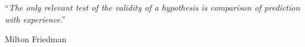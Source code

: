 \begin{frame}
\begin{center}
{\huge ``\emph{The only relevant test of the validity of a hypothesis is comparison of prediction with experience}.''\par}
\vspace{1cm}
Milton Friedman
\end{center}
\end{frame}





